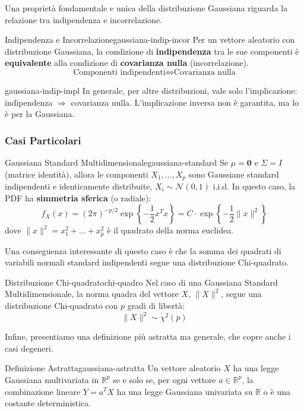 Una proprietà fondamentale e unica della distribuzione Gaussiana riguarda la
relazione tra indipendenza e incorrelazione.

\begin{teorema}{Indipendenza e Incorrelazione}{gaussiana-indip-incor}
Per un vettore aleatorio con distribuzione Gaussiana, la condizione di
\textbf{indipendenza} tra le sue componenti è \textbf{equivalente} alla
condizione di \textbf{covarianza nulla} (incorrelazione).
$$
\text{Componenti indipendenti} \iff \text{Covarianza nulla}
$$
\end{teorema}

\begin{nota}{}{gaussiana-indip-impl}
In generale, per altre distribuzioni, vale solo l'implicazione: indipendenza
$\Rightarrow$ covarianza nulla. L'implicazione inversa non è garantita, ma lo
è per la Gaussiana.
\end{nota}

\subsubsection*{Casi Particolari}

\begin{proposizione}{Gaussiana Standard Multidimensionale}{gaussiana-standard}
Se $\mu = \mathbf{0}$ e $\Sigma = I$ (matrice identità), allora le componenti
$X_1, \dots, X_p$ sono Gaussiane standard indipendenti e identicamente
distribuite, $X_i \sim \mathcal{N}(0,1)$ i.i.d.
In questo caso, la PDF ha \textbf{simmetria sferica} (o radiale):
$$
f_X(x) = (2\pi)^{-p/2} \exp\left\{-\frac{1}{2}x^T x\right\} = C \cdot
\exp\left\{-\frac{1}{2}\|x\|^2\right\}
$$
dove $\|x\|^2 = x_1^2 + \dots + x_p^2$ è il quadrato della norma euclidea.
\end{proposizione}

Una conseguenza interessante di questo caso è che la somma dei quadrati di
variabili normali standard indipendenti segue una distribuzione Chi-quadrato.

\begin{nota}{Distribuzione Chi-quadrato}{chi-quadro}
Nel caso di una Gaussiana Standard Multidimensionale, la norma quadra del
vettore $X$, $\|X\|^2$, segue una distribuzione Chi-quadrato con $p$ gradi di
libertà:
$$
\|X\|^2 \sim \chi^2(p)
$$
\end{nota}

Infine, presentiamo una definizione più astratta ma generale, che copre anche i
casi degeneri.

\begin{definizione}{Definizione Astratta}{gaussiana-astratta}
Un vettore aleatorio $X$ ha una legge Gaussiana multivariata in $\mathbb{R}^p$
se e solo se, per ogni vettore $a \in \mathbb{R}^p$, la combinazione lineare $Y
= a^T X$ ha una legge Gaussiana univariata su $\mathbb{R}$ o è una costante
deterministica.
\end{definizione}

